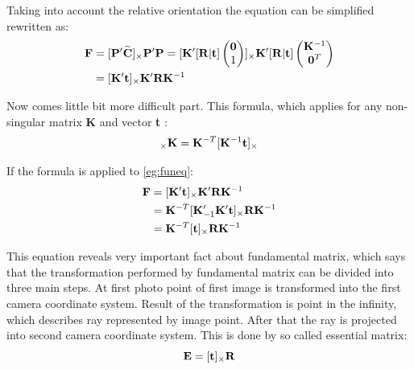 \documentclass[a4paper,12pt]{article}
\newcommand{\ematr}[1]{
{\bf #1}
}
\newcommand{\evect}[1]{
{\bf #1}
}
\newcommand{\ehvect}[1]{
{\bf \widetilde{#1}}
}
\begin{document}
Taking into account the relative orientation the equation can be simplified rewritten as:
\begin{equation}
\label{eg:funeq}
\begin{split}
\ematr{F}  &= [\ematr{P}'\ehvect{C}]_{\times} \ematr{P}'\ematr{P} 
= [\ematr{K}' [\ematr{R}|\evect{t}]
\begin{pmatrix}
   \evect{0} \\
    1 \\
\end{pmatrix}]
_{\times} 
\ematr{K}' [\ematr{R}|\evect{t}]  
\begin{pmatrix}
   \evect{K}^{-1} \\
   \evect{0}^{T} \\
\end{pmatrix} \\
&= [\ematr{K}' \evect{t}]_{\times} \ematr{K}'\ematr{R}\ematr{K}^{-1} 
\end{split}
\end{equation}

Now comes little bit more difficult part.
This formula,
which applies for any non-singular matrix \ematr{K} and vector \evect{t}:
\begin{equation}
[\evect{t}]_{\times} \ematr{K} = \ematr{K}^{-T}[\ematr{K}^{-1}\evect{t}]_{\times}
\end{equation}

If the formula is applied to \eqref{eg:funeq}:  
\begin{equation}
\begin{split}
\ematr{F}  &= [\ematr{K}' \evect{t}]_{\times} \ematr{K}' \ematr{R} \ematr{K}^{-1} \\
	   &= \ematr{K}^{-T} [\ematr{K}'_{-1} \ematr{K}' \evect{t}]_{\times} \ematr{R} \ematr{K}^{-1} \\
	   &= \ematr{K}^{-T} [\evect{t}]_{\times} \ematr{R} \ematr{K}^{-1}
\end{split}
\end{equation}

This equation reveals very important fact about fundamental matrix, which says that the transformation performed 
by fundamental matrix can be divided into three main steps.
At first photo point of first image is transformed into the first camera coordinate system. Result of the transformation is 
point in the infinity, which describes ray represented by image point. 
After that the ray is projected into second camera coordinate system. This is done by so called essential matrix:
\begin{equation}
	 \ematr{E}  = [\evect{t}]_{\times} \ematr{R}
\end{equation}
\end{document}
